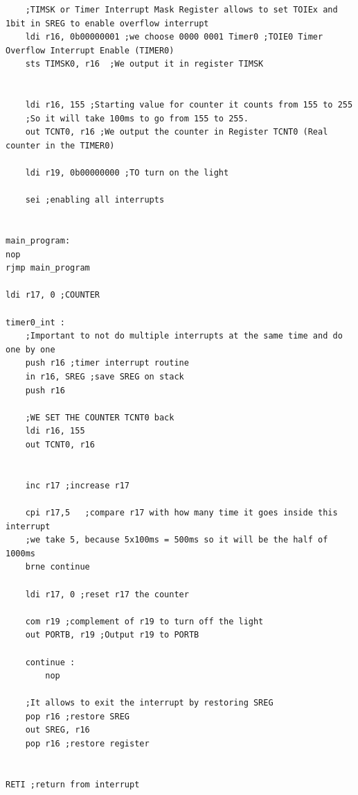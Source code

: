 \documentclass[a4paper,12pt]{article}
\begin{document}
\begin{lstlisting}
	;TIMSK or Timer Interrupt Mask Register allows to set TOIEx and 1bit in SREG to enable overflow interrupt
	ldi r16, 0b00000001 ;we choose 0000 0001 Timer0 ;TOIE0 Timer Overflow Interrupt Enable (TIMER0)
	sts TIMSK0, r16  ;We output it in register TIMSK


	ldi r16, 155 ;Starting value for counter it counts from 155 to 255
	;So it will take 100ms to go from 155 to 255.
	out TCNT0, r16 ;We output the counter in Register TCNT0 (Real counter in the TIMER0)

	ldi r19, 0b00000000 ;TO turn on the light

	sei ;enabling all interrupts


main_program:
nop
rjmp main_program

ldi r17, 0 ;COUNTER

timer0_int :
	;Important to not do multiple interrupts at the same time and do one by one
	push r16 ;timer interrupt routine
	in r16, SREG ;save SREG on stack
	push r16

	;WE SET THE COUNTER TCNT0 back
	ldi r16, 155
	out TCNT0, r16


	inc r17 ;increase r17

	cpi r17,5   ;compare r17 with how many time it goes inside this interrupt
	;we take 5, because 5x100ms = 500ms so it will be the half of 1000ms
	brne continue

	ldi r17, 0 ;reset r17 the counter

	com r19 ;complement of r19 to turn off the light
	out PORTB, r19 ;Output r19 to PORTB

	continue :
		nop

	;It allows to exit the interrupt by restoring SREG
	pop r16 ;restore SREG
	out SREG, r16
	pop r16 ;restore register


RETI ;return from interrupt

\end{lstlisting}
\end{document}
